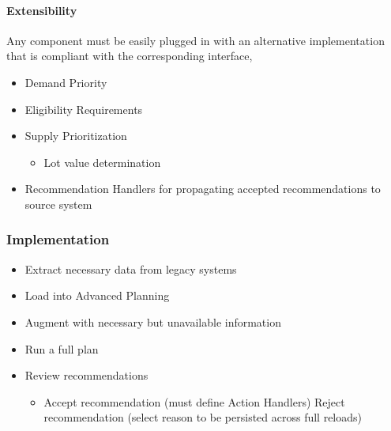 \documentclass[letterpaper,10pt,english]{sphinxmanual}
\begin{document}
\paragraph{Extensibility}
\label{\detokenize{FutureState:extensibility}}
Any component must be easily plugged in with an alternative
implementation that is compliant with the corresponding interface,
\begin{itemize}
\item {} 
Demand Priority

\item {} 
Eligibility Requirements

\item {} 
Supply Prioritization
\begin{itemize}
\item {} 
Lot value determination

\end{itemize}

\item {} 
Recommendation Handlers for propagating accepted recommendations to
source system

\end{itemize}


\subsubsection{Implementation}
\label{\detokenize{FutureState:implementation}}\begin{itemize}
\item {} 
Extract necessary data from legacy systems

\item {} 
Load into Advanced Planning

\item {} 
Augment with necessary but unavailable information

\item {} 
Run a full plan

\item {} 
Review recommendations
\begin{itemize}
\item {} 
Accept recommendation (must define Action Handlers) Reject
recommendation (select reason to be persisted across full reloads)

\end{itemize}

\end{itemize}
\end{document}
